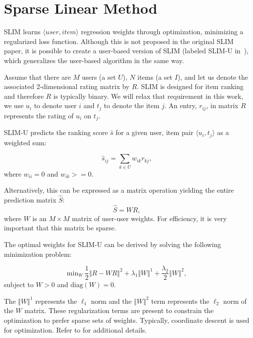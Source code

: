\section{Sparse Linear Method}

SLIM learns $\langle user, item \rangle$ regression weights through optimization, minimizing a regularized loss function. Although this is not proposed in the original SLIM paper, it is possible to create a user-based version of SLIM (labeled SLIM-U in~\cite{zheng2014cslim}), which generalizes the user-based algorithm in the same way. 

Assume that there are $M$ users (a set $U$), $N$ items (a set $I$), and let us denote the associated 2-dimensional rating matrix by $R$. SLIM is designed for item ranking and therefore $R$ is typically binary. We will relax that requirement in this work, we use $u_i$ to denote user $i$ and $t_j$ to denote the item $j$. An entry, $r_{ij}$, in matrix $R$ represents the rating of $u_i$ on $t_j$.

SLIM-U predicts the ranking score $\hat{s}$ for a given user, item pair $\langle u_i, t_j \rangle$ as a weighted sum:

\begin{equation}
    \hat{s}_{ij} = \sum_{k \in U}{w_{ik}r_{kj}}, 
\end{equation}
where $w_{ii} = 0$ and $w_{ik} >= 0$.

Alternatively, this can be expressed as a matrix operation yielding the entire prediction matrix $\hat{S}$:    
\begin{equation}
\hat{S} = WR,
\end{equation}
where $W$ is an $M \times M$ matrix of user-user weights. For efficiency, it is very important that this matrix be sparse.

The optimal weights for SLIM-U can be derived by solving the following minimization problem:

\begin{equation}
\text{min}_W~\frac{1}{2}\left\Vert R - WR \right\Vert^2 + 
    \lambda_1 \left\Vert W \right\Vert^1 +
    \frac{\lambda_2}{2}\left\Vert W \right\Vert^2,   
\end{equation}
subject to $W > 0$  and $\text{diag}(W) = 0$.

The $\left\Vert W \right\Vert^1$ represents the $\ell_1$ norm and the $\left\Vert W \right\Vert^2$ term represents the $\ell_2$ norm of the $W$ matrix. These regularization terms are present to constrain the optimization to prefer sparse sets of weights. Typically, coordinate descent is used for optimization. Refer to \cite{ning2011slim} for additional details. 

